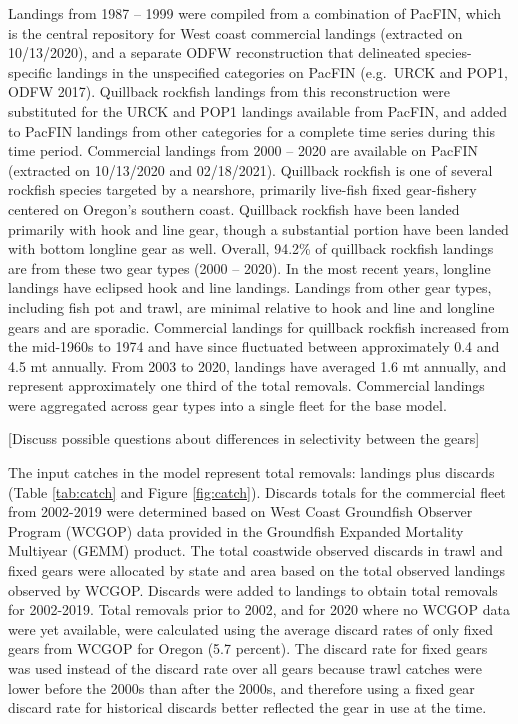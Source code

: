 \documentclass[11pt,
  english,
  a4paper,
]{article}
\begin{document}
Landings from 1987 -- 1999 were compiled from a combination of PacFIN, which is the central repository for West coast commercial landings (extracted on 10/13/2020), and a separate ODFW reconstruction that delineated species-specific landings in the unspecified categories on PacFIN (e.g.~URCK and POP1, ODFW 2017). Quillback rockfish landings from this reconstruction were substituted for the URCK and POP1 landings available from PacFIN, and added to PacFIN landings from other categories for a complete time series during this time period. Commercial landings from 2000 -- 2020 are available on PacFIN (extracted on 10/13/2020 and 02/18/2021). Quillback rockfish is one of several rockfish species targeted by a nearshore, primarily live-fish fixed gear-fishery centered on Oregon's southern coast. Quillback rockfish have been landed primarily with hook and line gear, though a substantial portion have been landed with bottom longline gear as well. Overall, 94.2\% of quillback rockfish landings are from these two gear types (2000 -- 2020). In the most recent years, longline landings have eclipsed hook and line landings. Landings from other gear types, including fish pot and trawl, are minimal relative to hook and line and longline gears and are sporadic. Commercial landings for quillback rockfish increased from the mid-1960s to 1974 and have since fluctuated between approximately 0.4 and 4.5 mt annually. From 2003 to 2020, landings have averaged 1.6 mt annually, and represent approximately one third of the total removals. Commercial landings were aggregated across gear types into a single fleet for the base model.

\leavevmode\tagmcend\tagstructend\par


{[}Discuss possible questions about differences in selectivity between the gears{]}

\leavevmode\tagmcend\tagstructend\par


The input catches in the model represent total removals: landings plus discards (Table \ref{tab:catch} and Figure \ref{fig:catch}). Discards totals for the commercial fleet from 2002-2019 were determined based on West Coast Groundfish Observer Program (WCGOP) data provided in the Groundfish Expanded Mortality Multiyear (GEMM) product. The total coastwide observed discards in trawl and fixed gears were allocated by state and area based on the total observed landings observed by WCGOP. Discards were added to landings to obtain total removals for 2002-2019. Total removals prior to 2002, and for 2020 where no WCGOP data were yet available, were calculated using the average discard rates of only fixed gears from WCGOP for Oregon (5.7 percent). The discard rate for fixed gears was used instead of the discard rate over all gears because trawl catches were lower before the 2000s than after the 2000s, and therefore using a fixed gear discard rate for historical discards better reflected the gear in use at the time.
\end{document}
